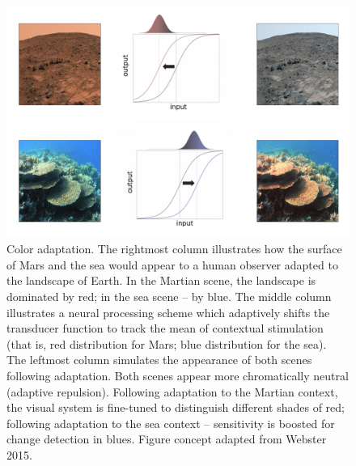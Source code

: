 \documentclass[a4paper, nobind]{templates/ociamthesis}
\begin{document}
\begin{figure}

{\centering \includegraphics[width=1\linewidth]{figures/intro-adaptation} 

}

\caption[Color adaptation]{Color adaptation. The rightmost column illustrates how the surface of Mars and the sea would appear to a human observer adapted to the landscape of Earth. In the Martian scene, the landscape is dominated by red; in the sea scene -- by blue. The middle column illustrates a neural processing scheme which adaptively shifts the transducer function to track the mean of contextual stimulation (that is, red distribution for Mars; blue distribution for the sea). The leftmost column simulates the appearance of both scenes following adaptation. Both scenes appear more chromatically neutral (adaptive repulsion). Following adaptation to the Martian context, the visual system is fine-tuned to distinguish different shades of red; following adaptation to the sea context -- sensitivity is boosted for change detection in blues. Figure concept adapted from Webster 2015.}\label{fig:intro-adaptation}
\end{figure}
\end{document}
